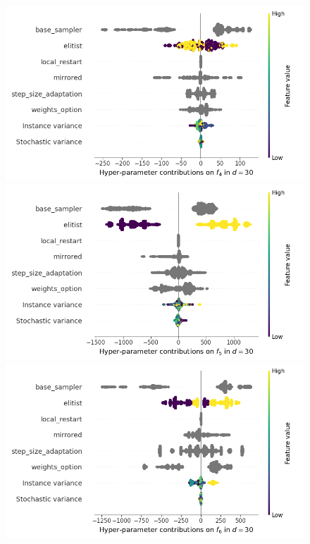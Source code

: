\begin{figure}[t]
	\includegraphics[height=0.15\textheight,trim=60mm 0mm 0mm 0mm,clip]{images/img_summary_f4_d30.png}
	\includegraphics[height=0.15\textheight,trim=0mm 0mm 30mm 0mm,clip]{images/img_summary_f5_d30.png}
	\includegraphics[height=0.15\textheight,trim=60mm 0mm 30mm 0mm,clip]{images/img_summary_f6_d30.png}

\end{figure}
